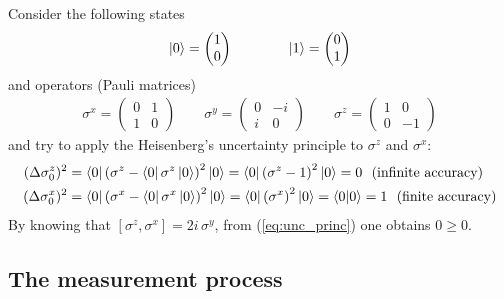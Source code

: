 \begin{tcolorbox}
Consider the following states 
\begin{align}
    \label{eq:bits}
    \ket{0} = \begin{pmatrix} 1 \\ 0 \end{pmatrix} \qquad \qquad \ket{1} = \begin{pmatrix} 0 \\ 1 \end{pmatrix} 
\end{align}
and operators (Pauli matrices)
\begin{align}
    \label{eq:Pauli_mat}
    \sigma^x = \begin{pmatrix} 0 & 1 \\ 1 & 0 \end{pmatrix} \qquad
    \sigma^y = \begin{pmatrix} 0 & -i \\ i & 0 \end{pmatrix} \qquad
    \sigma^z = \begin{pmatrix} 1 & 0 \\ 0 & -1 \end{pmatrix} 
\end{align}
and try to apply the Heisenberg's uncertainty principle to $\sigma^z$ and $\sigma^x$: 
\begin{align*}
    (\Delta \sigma^z_0)^2 &= \bra{0} \left(\sigma^z - \bra{0} \sigma^z \ket{0} \right)^2 \ket{0} = \bra{0} \left(\sigma^z - 1\right)^2 \ket{0} = 0 ~~(\text{infinite accuracy}) \\
    (\Delta \sigma^x_0)^2 &= \bra{0} \left(\sigma^x - \bra{0} \sigma^x \ket{0} \right)^2 \ket{0} = \bra{0} \left(\sigma^x\right)^2 \ket{0} = \braket{0}{0} = 1 ~~(\text{finite accuracy})
\end{align*}
By knowing that $[\sigma^z, \sigma^x] = 2 i \, \sigma^y$, from (\ref{eq:unc_princ}) one obtains $0 \geq 0$.
\end{tcolorbox}

\subsection{The measurement process}

